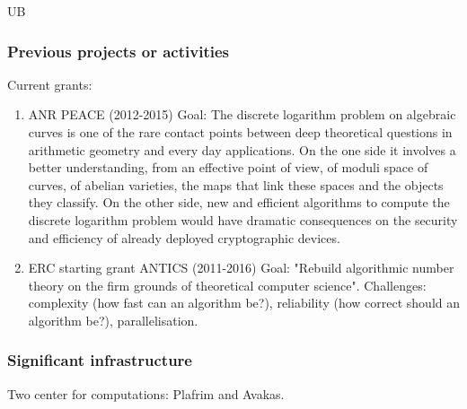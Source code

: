 \begin{sitedescription}{UB}
\subsubsection*{Previous projects or activities}

Current grants:
\begin{enumerate}
\item
 ANR PEACE (2012-2015)
    Goal: The discrete logarithm problem on algebraic curves is one of the rare
    contact points between deep theoretical questions in arithmetic geometry and
    every day applications. On the one side it involves a better understanding,
    from an effective point of view, of moduli space of curves, of abelian
    varieties, the maps that link these spaces and the objects they classify.
    On the other side, new and efficient algorithms to compute the discrete
    logarithm problem would have dramatic consequences on the security and
    efficiency of already deployed cryptographic devices. 

\item
ERC starting grant ANTICS (2011-2016) 
    Goal: "Rebuild algorithmic number theory on the firm grounds of theoretical
    computer science".
    Challenges: complexity (how fast can an algorithm be?), reliability
    (how correct should an algorithm be?), parallelisation.
\end{enumerate}

\subsubsection*{Significant infrastructure}

Two center for computations: Plafrim and Avakas.
\end{sitedescription}

